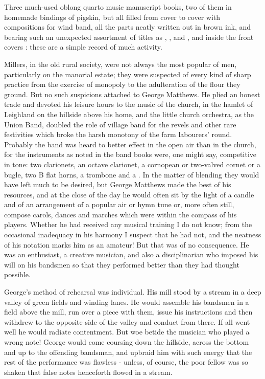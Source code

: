 Three much-used oblong quarto music manuscript books, two of them in homemade bindings of pigskin, but all filled from cover to cover with compositions for wind band, all the parts neatly written out in brown ink, and bearing such an unexpected assortment of titles as , ,  and , and inside the front covers : these are a simple record of much activity.

Millers, in the old rural society, were not always the most popular of men, particularly on the manorial estate; they were suspected of every kind of sharp practice from the exercise of monopoly to the adulteration of the flour they ground. But no such suspicions attached to George Matthews. He plied an honest trade and devoted his leisure hours to the music of the church, in the hamlet of Leighland on the hillside above his home, and the little church orchestra, as the Union Band, doubled the role of village band for the revels and other rare festivities which broke the harsh monotony of the farm labourers’ round. Probably the band was heard to better effect in the open air than in the church, for the instruments as noted in the band books were, one might say, competitive in tone: two clarionets, an octave clarionet, a cornopean or two-valved cornet or a bugle, two B flat horns, a trombone and a . In the matter of blending they would have left much to be desired, but George Matthews made the best of his resources, and at the close of the day he would often sit by the light of a candle and  of an arrangement of a popular air or hymn tune or, more often still, compose carols, dances and marches which were within the compass of his players. Whether he had received any musical training I do not know; from the occasional inadequacy in his harmony I suspect that he had not, and the neatness of his notation marks him as an amateur! But that was of no consequence. He was an enthusiast, a creative musician, and also a disciplinarian who imposed his will on his bandsmen so that they performed better than they had thought possible.

George's method of rehearsal was individual. His mill stood by a stream in a deep valley of green fields and winding lanes. He would assemble his bandsmen in a field above the mill, run over a piece with them, issue his instructions and then withdrew to the opposite side of the valley and conduct from there. If all went well he would radiate contentment. But woe betide the musician who played a wrong note! George would come coursing down the hillside, across the bottom and up to the offending bandsman, and upbraid him with such energy that the rest of the performance was flawless - unless, of course, the poor fellow was so shaken that false notes henceforth flowed in a stream.

